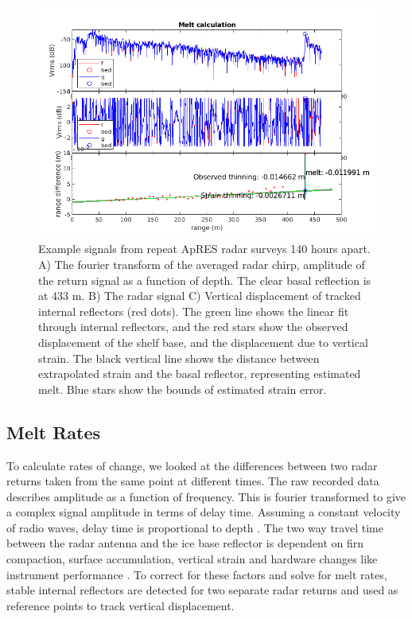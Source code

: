 \begin{figure}[!ht]
\centering
\includegraphics[width=1\textwidth]{chapters/3/melt_calc.png}
\caption[]{Example signals from repeat ApRES radar surveys 140 hours apart. A) The fourier transform of the averaged radar chirp, amplitude of the return signal as a function of depth. The clear basal reflection is at 433 m. B) The radar signal
C) Vertical displacement of tracked internal reflectors (red dots). The green line shows the linear fit through internal reflectors, and the red stars show the observed displacement of the shelf base, and the displacement due to vertical strain. The black vertical line shows the distance between extrapolated strain and the basal reflector, representing estimated melt. Blue stars show the bounds of estimated strain error. }
\label{fig:example_signal}
\end{figure}

\subsection{Melt Rates}

To calculate rates of change, we looked at the differences between two radar returns taken from the same point at different times.
The raw recorded data describes amplitude as a function of frequency. This is fourier transformed to give a complex signal amplitude in terms of delay time. Assuming a constant velocity of radio waves, delay time is proportional to depth \citep{nicholls2015ground}. 
The two way travel time between the radar antenna and the ice base reflector is dependent on firn compaction, surface accumulation, vertical strain and hardware changes like instrument performance \citep{nicholls2015ground}. To correct for these factors and solve for melt rates, stable internal reflectors are detected for two separate radar returns and used as reference points to track vertical displacement. 

